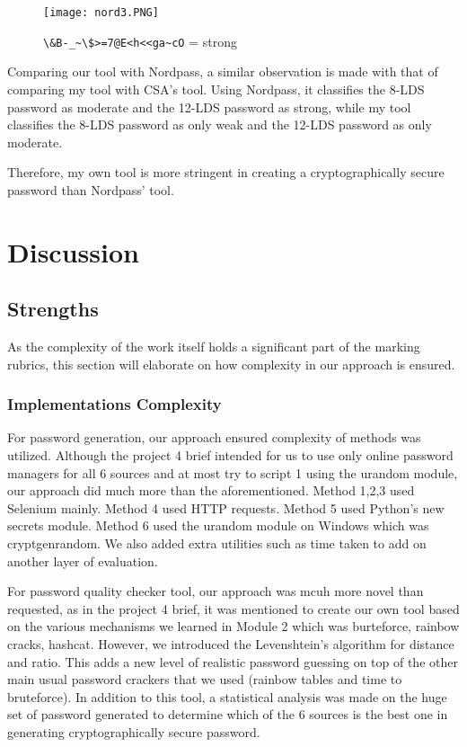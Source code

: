 \documentclass[letterpaper,twocolumn,10pt]{article}
\begin{document}
\begin{figure}[H]
    \centering
    \texttt{[image: nord3.PNG]}
    \caption{\lstinline{\&B-_~\$>=7@E<h<<ga~cO} = strong}
\end{figure}

Comparing our tool with Nordpass, a similar observation is made with that of comparing my tool with CSA's tool. Using Nordpass, it classifies the 8-LDS password as moderate and the 12-LDS password as strong, while my tool classifies the 8-LDS password as only weak and the 12-LDS password as only moderate. 

Therefore, my own tool is more stringent in creating a cryptographically secure password than Nordpass' tool.

\section{Discussion}

\subsection{Strengths}
As the complexity of the work itself holds a significant part of the marking rubrics, this section will elaborate on how complexity in our approach is ensured.

\subsubsection{Implementations Complexity}
For password generation, our approach ensured complexity of methods was utilized. Although the project 4 brief intended for us to use only online password managers for all 6 sources and at most try to script 1 using the urandom module, our approach did much more than the aforementioned. Method 1,2,3 used Selenium mainly. Method 4 used HTTP requests. Method 5 used Python's new secrets module. Method 6 used the urandom module on Windows which was cryptgenrandom. We also added extra utilities such as time taken to add on another layer of evaluation.

For password quality checker tool, our approach was mcuh more novel than requested, as in the project 4 brief, it was mentioned to create our own tool based on the various mechanisms we learned in Module 2 which was burteforce, rainbow cracks, hashcat. However, we introduced the Levenshtein's algorithm for distance and ratio. This adds a new level of realistic password guessing on top of the other main usual password crackers that we used (rainbow tables and time to bruteforce). In addition to this tool, a statistical analysis was made on the huge set of password generated to determine which of the 6 sources is the best one in generating cryptographically secure password.
\end{document}
